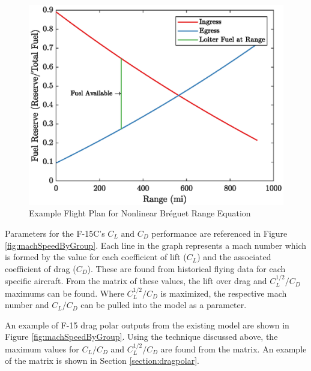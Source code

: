 \begin{figure}[H]
    \centering
    \includegraphics{Thesis/Method/NLFlightPlanT37.eps}
    \caption{Example Flight Plan for Nonlinear Br\'eguet Range Equation}
    \label{fig:NLFlightPlanT37}
\end{figure}
\par
Parameters for the F-15C's $C_L\text{ and }C_D$ performance are referenced in Figure \ref{fig:machSpeedByGroup}. Each line in the graph represents a mach number which is formed by the value for each coefficient of lift ($C_L$) and the associated coefficient of drag ($C_D$). These are found from historical flying data for each specific aircraft. From the matrix of these values, the lift over drag and $C_L^{1/2}/C_D$ maximums can be found. Where $C_L^{1/2}/C_D$ is maximized, the respective mach number and $C_L/C_D$ can be pulled into the model as a parameter.\par
An example of F-15 drag polar outputs from the existing model are shown in Figure \ref{fig:machSpeedByGroup}. Using the technique discussed above, the maximum values for $C_L/C_D$ and $C_L^{1/2}/C_D$ are found from the matrix. An example of the matrix is shown in Section \ref{section:dragpolar}.

